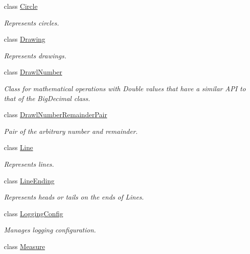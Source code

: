 \begin{DoxyCompactItemize}
\item 
class \hyperlink{classcom_1_1aarrelaakso_1_1drawl_1_1_circle}{Circle}
\begin{DoxyCompactList}\small\item\em Represents circles. \end{DoxyCompactList}\item 
class \hyperlink{classcom_1_1aarrelaakso_1_1drawl_1_1_drawing}{Drawing}
\begin{DoxyCompactList}\small\item\em Represents drawings. \end{DoxyCompactList}\item 
class \hyperlink{classcom_1_1aarrelaakso_1_1drawl_1_1_drawl_number}{Drawl\+Number}
\begin{DoxyCompactList}\small\item\em Class for mathematical operations with Double values that have a similar A\+PI to that of the Big\+Decimal class. \end{DoxyCompactList}\item 
class \hyperlink{classcom_1_1aarrelaakso_1_1drawl_1_1_drawl_number_remainder_pair}{Drawl\+Number\+Remainder\+Pair}
\begin{DoxyCompactList}\small\item\em Pair of the arbitrary number and remainder. \end{DoxyCompactList}\item 
class \hyperlink{classcom_1_1aarrelaakso_1_1drawl_1_1_line}{Line}
\begin{DoxyCompactList}\small\item\em Represents lines. \end{DoxyCompactList}\item 
class \hyperlink{classcom_1_1aarrelaakso_1_1drawl_1_1_line_ending}{Line\+Ending}
\begin{DoxyCompactList}\small\item\em Represents heads or tails on the ends of Lines. \end{DoxyCompactList}\item 
class \hyperlink{classcom_1_1aarrelaakso_1_1drawl_1_1_logging_config}{Logging\+Config}
\begin{DoxyCompactList}\small\item\em Manages logging configuration. \end{DoxyCompactList}\item 
class \hyperlink{classcom_1_1aarrelaakso_1_1drawl_1_1_measure}{Measure}

\end{DoxyCompactItemize}
